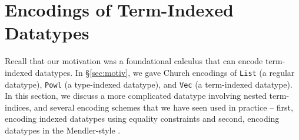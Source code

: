 \section{Encodings of Term-Indexed Datatypes} \label{sec:data}
Recall that our motivation was a foundational calculus
that can encode term-indexed datatypes. In \S\ref{sec:motiv},
we gave Church encodings of
{\small\tt List} (a regular datatype),
{\small\tt Powl} (a type-indexed datatype), and
{\small\tt Vec} (a term-indexed datatype).
In this section, we discuss a more complicated datatype \cite{BraHam10}
involving nested term-indices, and several encoding schemes
that we have seen used in practice --
first, encoding indexed datatypes using equality constraints
\cite{Sheard04equality,Crary98} and second, encoding datatypes
in the Mendler-style \cite{AbeMatUus05,AhnShe11}.
\vspace*{-1ex}
